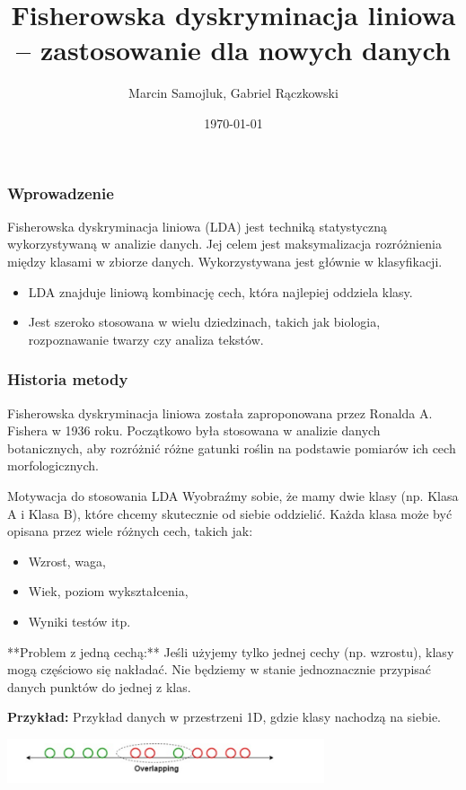 \documentclass{beamer}
\title{Fisherowska dyskryminacja liniowa – zastosowanie dla nowych danych}
\author{Marcin Samojluk, Gabriel Rączkowski}
\date{\today}
\begin{document}
\begin{frame}
    \titlepage
\end{frame}

\begin{frame}
    \frametitle{Wprowadzenie}
    Fisherowska dyskryminacja liniowa (LDA) jest techniką statystyczną wykorzystywaną w analizie danych. Jej celem jest maksymalizacja rozróżnienia między klasami w zbiorze danych. Wykorzystywana jest głównie w klasyfikacji.
    \begin{itemize}
        \item LDA znajduje liniową kombinację cech, która najlepiej oddziela klasy.
        \item Jest szeroko stosowana w wielu dziedzinach, takich jak biologia, rozpoznawanie twarzy czy analiza tekstów.
    \end{itemize}
\end{frame}

\begin{frame}
    \frametitle{Historia metody}
    Fisherowska dyskryminacja liniowa została zaproponowana przez Ronalda A. Fishera w 1936 roku. Początkowo była stosowana w analizie danych botanicznych, aby rozróżnić różne gatunki roślin na podstawie pomiarów ich cech morfologicznych.
\end{frame}





\begin{frame}{Motywacja do stosowania LDA}
    Wyobraźmy sobie, że mamy dwie klasy (np. Klasa A i Klasa B), które chcemy skutecznie od siebie oddzielić. Każda klasa może być opisana przez wiele różnych cech, takich jak:
    \begin{itemize}
        \item Wzrost, waga,
        \item Wiek, poziom wykształcenia,
        \item Wyniki testów itp.
    \end{itemize}
    
    \bigskip
    **Problem z jedną cechą:** Jeśli użyjemy tylko jednej cechy (np. wzrostu), klasy mogą częściowo się nakładać. Nie będziemy w stanie jednoznacznie przypisać danych punktów do jednej z klas.

    \bigskip
    \textbf{Przykład:} Przykład danych w przestrzeni 1D, gdzie klasy nachodzą na siebie.
    
    \bigskip
    \includegraphics[width=0.7\textwidth]{overlapping.png} 
\end{frame}
\end{document}
